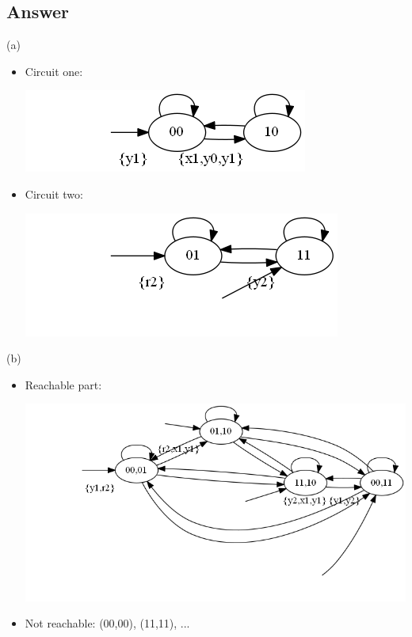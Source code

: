 \documentclass[12pt]{article}
\begin{document}
\subsection*{Answer}
(a) 
\begin{itemize}
	\item Circuit one:\\
	 \begin{centering}
		\includegraphics*[scale=0.5]{21a1.png}
	\end{centering}
	\item Circuit two:\\
	\begin{centering}
		\includegraphics*[scale=0.5]{21a2.png}
	\end{centering}
\end{itemize}
\newpage
(b)
\begin{itemize}
	\item Reachable part:\\
	\begin{centering}
		\includegraphics*[scale=0.5]{21b.png}
	\end{centering}
	\item Not reachable: (00,00), (11,11), ...
\end{itemize}
\end{document}
